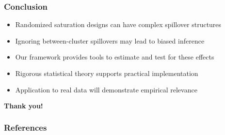 \documentclass{beamer}
\begin{document}
\begin{frame}
\frametitle{Conclusion}
\begin{itemize}
\item Randomized saturation designs can have complex spillover structures
\item Ignoring between-cluster spillovers may lead to biased inference
\item Our framework provides tools to estimate and test for these effects
\item Rigorous statistical theory supports practical implementation
\item Application to real data will demonstrate empirical relevance
\end{itemize}

\vspace{0.5cm}
\begin{center}
\textbf{Thank you!}
\end{center}
\end{frame}

\begin{frame}[allowframebreaks]
\frametitle{References}


\end{frame}
\end{document}
